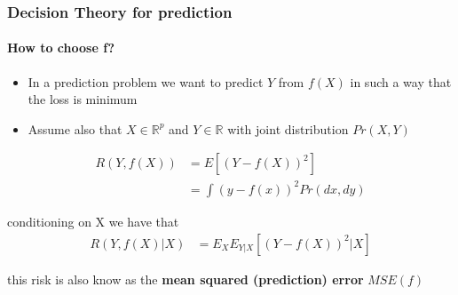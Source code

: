 \documentclass[
  shownotes,
  xcolor={svgnames},
  hyperref={colorlinks,citecolor=DarkBlue,linkcolor=DarkRed,urlcolor=DarkBlue}
  , aspectratio=169]{beamer}
\begin{document}

\begin{frame}

\frametitle{ Decision Theory for prediction}
\framesubtitle{How to choose f?}
\begin{itemize}
  \item In a prediction problem we want to predict $Y$ from $f(X)$ in such a way that the loss is minimum
  \item Assume also that $X \in \mathbb{R}^p$ and $Y \in \mathbb{R}$ with joint distribution $Pr(X,Y)$
\end{itemize}

\begin{align}
  R(Y,f(X)) &=E[(Y-f(X))^2] \\
            &=\int (y-f(x))^2 Pr(dx,dy)
\end{align}

conditioning on X we have that
\begin{align}
 R(Y,f(X)|X) &= E_X E_{Y|X} [(Y-f(X))^2|X]
\end{align}

this risk is also know as the {\bf mean squared (prediction) error} $MSE(f)$ 
\end{frame}
\end{document}
